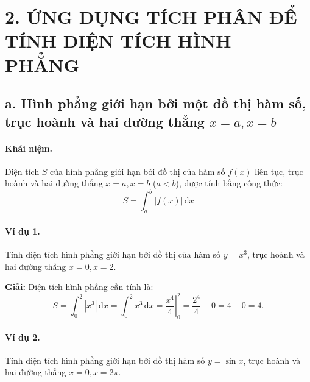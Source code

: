 \section*{2. ỨNG DỤNG TÍCH PHÂN ĐỂ TÍNH DIỆN TÍCH HÌNH PHẲNG}

\subsection*{a. Hình phẳng giới hạn bởi một đồ thị hàm số, trục hoành và hai đường thẳng $x = a, x = b$}

\paragraph{Khái niệm.} 
Diện tích $S$ của hình phẳng giới hạn bởi đồ thị của hàm số $f(x)$ liên tục, trục hoành và hai đường thẳng $x = a, x = b$ ($a < b$), được tính bằng công thức:
\[
S = \int_{a}^{b} |f(x)| \, \mathrm{d}x
\]

\paragraph{Ví dụ 1.} Tính diện tích hình phẳng giới hạn bởi đồ thị của hàm số $y = x^3$, trục hoành và hai đường thẳng $x = 0, x = 2$.

\noindent\textbf{Giải:}  
Diện tích hình phẳng cần tính là:
\[
S = \int_{0}^{2} |x^3| \, \mathrm{d}x = \int_{0}^{2} x^3 \, \mathrm{d}x = \left. \frac{x^4}{4} \right|_{0}^{2} = \frac{2^4}{4} - 0 = 4 - 0 = 4.
\]

\begin{center}
\end{center}

\paragraph{Ví dụ 2.} Tính diện tích hình phẳng giới hạn bởi đồ thị hàm số $y = \sin x$, trục hoành và hai đường thẳng $x = 0, x = 2\pi$.

